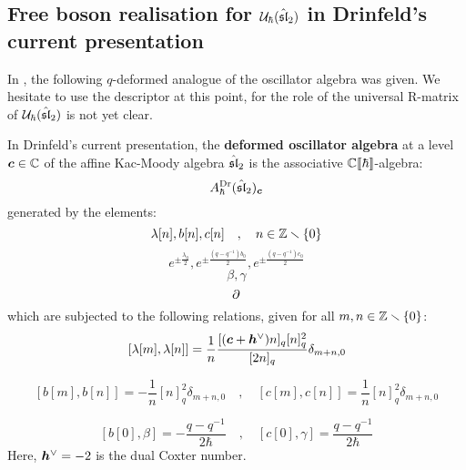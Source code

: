     \subsection{\texorpdfstring{Free boson realisation for $\calU_{\hbar}(\hat{\sl}_2)$ in Drinfeld's current presentation}{}}
        In \cite[Section 7]{frenkel_reshetikhin_affine_QUEs_and_deformed_virasoro_and_finite_W_algebras}, the following $q$-deformed analogue of the oscillator algebra was given. We hesitate to use the descriptor  at this point, for the role of the universal R-matrix of $\calU_{\hbar}(\hat{\sl}_2)$ is not yet clear.
        \begin{definition} \label{def: q_deformed_affine_sl_2_oscillator_algebra_drinfeld_current_presentation}
            In Drinfeld's current presentation, the \textbf{deformed oscillator algebra} at a level $\level \in \bbC$ of the affine Kac-Moody algebra $\hat{\sl}_2$ is the associative $\bbC[\![\hbar]\!]$-algebra:
                $$A_{\hbar}^{\current}(\hat{\sl}_2)_{\level}$$
            generated by the elements:
                $$\lambda[n], b[n], c[n] \quad, \quad n \in \Z \setminus \{0\}$$
                $$e^{\pm \frac{\lambda_0}{2}}, e^{\pm \frac{(q - q^{-1}) b_0}{2}}, e^{\pm \frac{(q - q^{-1}) c_0}{2}}$$
                $$\beta, \gamma$$
                $$\del$$
            which are subjected to the following relations, given for all $m, n \in \Z \setminus \{0\}$:
                \begin{equation} \label{equation: q_deformed_affine_sl_2_oscillator_lambda_commutators}
                    [ \lambda[m], \lambda[n] ] = \frac1n \frac{ [(\level + \dualcoxeter) n]_q [n]_q^2 }{ [2n]_q } \delta_{m + n, 0}
                \end{equation}
                
                \begin{equation} \label{equation: q_deformed_affine_sl_2_oscillator_bc_commutators}
                    [ b[m], b[n] ] = -\frac1n [n]_q^2 \delta_{m + n, 0} \quad, \quad [ c[m], c[n] ] = \frac1n [n]_q^2 \delta_{m + n, 0}
                \end{equation}
                
                \begin{equation} \label{equation: q_deformed_affine_sl_2_oscillator_beta_gamma_commutators}
                    [ b[0], \beta ] = -\frac{q - q^{-1}}{2\hbar} \quad, \quad [ c[0], \gamma ] = \frac{q - q^{-1}}{2\hbar}
                \end{equation}
            Here, $\dualcoxeter = -2$ is the dual Coxter number.
        \end{definition}
        
